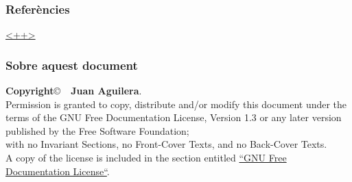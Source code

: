 \documentclass{beamer}
\begin{document}

\begin{frame}
	\frametitle{Referències}
	\begin{thebibliography}{99}
		\bibitem{<++>} \url{<++>}
	\end{thebibliography}
\end{frame}

\begin{frame}
	\frametitle{Sobre aquest document}
	\textbf{Copyright}\copyright\ \textbf{\the\year\ Juan Aguilera}.\\
	Permission is granted to copy, distribute and/or modify this document under the terms of the GNU Free Documentation License, Version 1.3 or any later version published by the Free Software Foundation;\\
	with no Invariant Sections, no Front-Cover Texts, and no Back-Cover Texts.\\
	A copy of the license is included in the section entitled \href{http://www.gnu.org/licenses/fdl.html}{``GNU Free Documentation License``}.
\end{frame}
\end{document}
